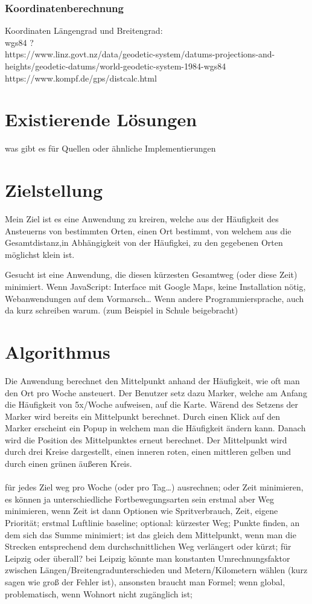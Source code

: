 \documentclass[a4paper, twoside, 12pt]{scrreprt}
\begin{document}
\subsection{Koordinatenberechnung}
Koordinaten Längengrad und Breitengrad:\\ wgs84 ? \\
https://www.linz.govt.nz/data/geodetic-system/datums-projections-and-heights/geodetic-datums/world-geodetic-system-1984-wgs84 \\
https://www.kompf.de/gps/distcalc.html
\chapter{Existierende Lösungen}
was gibt es für Quellen oder ähnliche Implementierungen
\chapter{Zielstellung}
Mein Ziel ist es eine Anwendung zu kreiren, welche aus der Häufigkeit des Ansteuerns von bestimmten Orten, einen Ort bestimmt, von welchem aus die Gesamtdistanz,in Abhängigkeit von der Häufigkei, zu den gegebenen Orten möglichst klein ist.

Gesucht ist eine Anwendung, die diesen kürzesten Gesamtweg (oder diese Zeit) minimiert.
Wenn JavaScript: Interface mit Google Maps, keine Installation nötig, Webanwendungen auf dem Vormarsch…
Wenn andere Programmiersprache, auch da kurz schreiben warum.
(zum Beispiel in Schule beigebracht)
\chapter{Algorithmus}
Die Anwendung berechnet den Mittelpunkt anhand der Häufigkeit, wie oft man den Ort pro Woche ansteuert. Der Benutzer setz dazu Marker, welche am Anfang die Häufigkeit von 5x/Woche aufweisen, auf die Karte.
Wärend des Setzens der Marker wird bereits ein Mittelpunkt berechnet.
Durch einen Klick auf den Marker erscheint ein Popup in welchem man die Häufigkeit ändern kann. 
Danach wird die Position des Mittelpunktes erneut berechnet.
Der Mittelpunkt wird durch drei Kreise dargestellt, einen inneren roten, einen mittleren gelben und durch einen grünen äußeren Kreis.
\\\\
für jedes Ziel weg pro Woche (oder pro Tag…) ausrechnen;
oder Zeit minimieren, es können ja unterschiedliche Fortbewegungsarten sein
erstmal aber Weg minimieren, wenn Zeit ist dann Optionen wie Spritverbrauch, Zeit, eigene Priorität;
erstmal Luftlinie baseline;
optional: kürzester Weg;
Punkte finden, an dem sich das Summe minimiert;
ist das gleich dem Mittelpunkt, wenn man die Strecken entsprechend dem durchschnittlichen Weg verlängert oder kürzt;
für Leipzig oder überall? bei Leipzig könnte man konstanten Umrechnungsfaktor zwischen Längen/Breitengradunterschieden und Metern/Kilometern wählen (kurz sagen wie groß der Fehler ist), ansonsten braucht man Formel;
wenn global, problematisch, wenn Wohnort nicht zugänglich ist;
\end{document}
